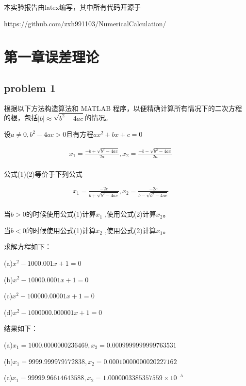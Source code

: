 \documentclass[UTF8]{ctexart}
\begin{document}
本实验报告由latex编写，其中所有代码开源于

\href{https://github.com/zxh991103/NumericalCalculation/}{https://github.com/zxh991103/NumericalCalculation/}


\newpage


\section{第一章误差理论}

\subsection{problem 1}
根据以下方法构造算法和 MATLAB 程序，以便精确计算所有情况下的二次方程的根，包括$|b| \approx \sqrt {b^2-4ac} $的情况。


设$ a \not= 0 ,b^2-4ac > 0 $且有方程$ ax^2+bx+c=0$


\begin{equation}
\begin{array}{rcl}
x_1=\frac{-b+\sqrt{b^2-4ac}}{2a} , x_2=\frac{-b-\sqrt{b^2-4ac}}{2a}& & { }\\
\end{array}
\end{equation}

公式(1)(2)等价于下列公式

\begin{equation}
\begin{array}{rcl}
x_1=\frac{-2c}{b+\sqrt{b^2-4ac}} , x_2=\frac{-2c}{b-\sqrt{b^2-4ac}}& & { }\\
\end{array}
\end{equation}

当$b>0$的时候使用公式(1)计算$ x_1$ ,使用公式(2)计算$ x_2$。


当$b<0$的时候使用公式(1)计算$ x_2$ ,使用公式(2)计算$ x_1$。

求解方程如下：

(a)$ x^2-1000.001x+1=0$

(b)$ x^2-10000.0001x+1=0$

(c)$ x^2-100000.00001x+1=0$

(d)$ x^2-1000000.000001x+1=0$

结果如下：

(a)$ x_1=1000.0000000236469 , x_2=0.0009999999999763531$

(b)$ x_1=9999.999979772838 , x_2=0.00010000000020227162$

(c)$ x_1=99999.96614643588 , x_2=1.0000003385357559\times 10^{-5}$
\end{document}
